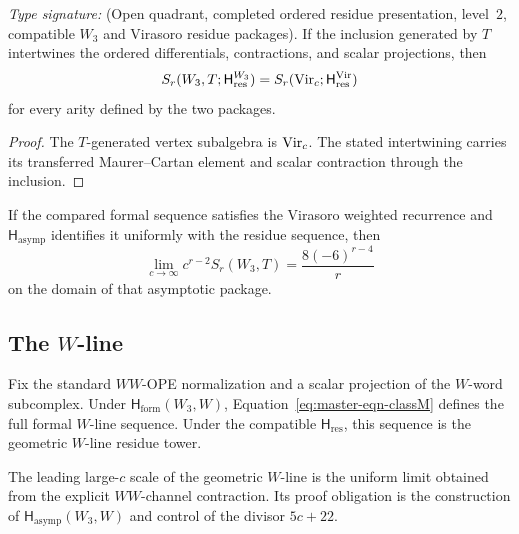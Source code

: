 \begin{proposition}
\label{prop:w3-tline-virasoro-inheritance}
\ClaimStatusConditional
\emph{Type signature:}
\textup{(Open quadrant, completed ordered residue presentation,
level~\(2\), compatible \(W_3\) and Virasoro residue packages).}
If the inclusion generated by \(T\) intertwines the ordered
differentials, contractions, and scalar projections, then
\[
 S_r(W_3,T;\mathsf H_{\mathrm{res}}^{W_3})
 =S_r(\mathrm{Vir}_c;\mathsf H_{\mathrm{res}}^{\mathrm{Vir}})
\]
for every arity defined by the two packages.
\end{proposition}

\begin{proof}
The \(T\)-generated vertex subalgebra is \(\mathrm{Vir}_c\).  The stated
intertwining carries its transferred Maurer--Cartan element and scalar
contraction through the inclusion.
\end{proof}

\begin{corollary}
\label{cor:w3-tline-asymptotic}
\ClaimStatusConditional
If the compared formal sequence satisfies the Virasoro weighted
recurrence and \(\mathsf H_{\mathrm{asymp}}\) identifies it uniformly
with the residue sequence, then
\[
 \lim_{c\to\infty}c^{r-2}S_r(W_3,T)
 =\frac{8(-6)^{r-4}}r
\]
on the domain of that asymptotic package.
\end{corollary}

\subsection{The \(W\)-line}

\begin{proposition}
\label{prop:w3-wline-closed-form}
\ClaimStatusConditional
Fix the standard \(WW\)-OPE normalization and a scalar projection of
the \(W\)-word subcomplex.  Under
\(\mathsf H_{\mathrm{form}}(W_3,W)\), Equation~\eqref{eq:master-eqn-classM}
defines the full formal \(W\)-line sequence.  Under the compatible
\(\mathsf H_{\mathrm{res}}\), this sequence is the geometric
\(W\)-line residue tower.
\end{proposition}

\begin{proposition}
\label{prop:w3-wline-leading-asymptotic}
\ClaimStatusOpen
The leading large-\(c\) scale of the geometric \(W\)-line is the
uniform limit obtained from the explicit \(WW\)-channel contraction.
Its proof obligation is the construction of
\(\mathsf H_{\mathrm{asymp}}(W_3,W)\) and control of the divisor
\(5c+22\).
\end{proposition}

